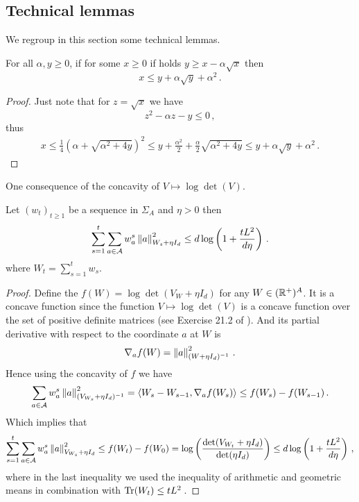 \subsection{Technical lemmas}
We regroup in this section  some technical lemmas.
\begin{lemma}
\label{lem:inq_revert_sqrt}
For all $\alpha,y\geq 0$, if for some $x\geq 0$ if holds $y \geq x-\alpha\sqrt{x}$ then
\[
x \leq y + \alpha \sqrt{y} + \alpha^2\,.
\]
\end{lemma}
\begin{proof}
Just note that for $z=\sqrt{x}$ we have
\[
z^2-\alpha z -y \leq 0\,,
\]
thus
\begin{align*}
  x \leq \frac{1}{4}\left(\alpha +\sqrt{\alpha^2+4y}\right)^2
  \leq y +\frac{\alpha^2}{2}+\frac{\alpha}{2}\sqrt{\alpha^2+4y}
  \leq y +\alpha\sqrt{y}+\alpha^2\,.
\end{align*}
\end{proof}
One consequence of the concavity of $V\mapsto \log\det(V)$.
\begin{lemma}
\label{lem:sum_w_norm_a}
Let $(w_t)_{t\geq 1}$ be a sequence in $\Sigma_A$ and $\eta>0$ then
\[
\sum_{s=1}^t \sum_{a\in\mathcal{A}} w_a^s \left\lVert a\right\rVert^2_{W_s +\eta I_d} \leq d \log\left(1 +\frac{t L^2}{d \eta}\right)\,.
\]
where $W_t = \sum_{s=1}^t w_s$.
\end{lemma}
\begin{proof}
Define the $f(W)= \log\det(V_W+\eta I_d)$ for any $W\in(\mathbb{R}^+)^A$. It is a concave function since the function
$V\mapsto \log\det(V)$ is a concave function over the set of positive definite matrices (see Exercise 21.2 of \citealt{lattimore2018}). And its partial derivative with respect to the coordinate $a$ at $W$ is
\[
    \nabla_a f(W) = \left\lVert a\right\rVert^2_{(W+\eta I_d)^{-1}}\,.
\]
Hence using the concavity of $f$ we have
\begin{align*}
  \sum_{a\in\mathcal{A}} w_a^s \left\lVert a\right\rVert^2_{(V_{W_s} +\eta I_d)^{-1}} = \langle W_s - W_{s-1}, \nabla_a f(W_s) \rangle \leq f(W_s) - f(W_{s-1})\,.
\end{align*}
Which implies that
\begin{align*}
  \sum_{s=1}^t \sum_{a\in\mathcal{A}} w_a^s \left\lVert a\right\rVert^2_{V_{W_s} +\eta I_d} \leq f(W_t)-f(W_0) = \log\left(\frac{\det(V_{W_t} +\eta I_d) }{\det(\eta I_d)}\right) \leq d \log\left(1 +\frac{t L^2}{d \eta}\right)\,,
\end{align*}
where in the last inequality we used the inequality of arithmetic and geometric means in combination with $\operatorname{\mathrm{Tr}}(W_t) \leq t L^2$\,.
\end{proof}
